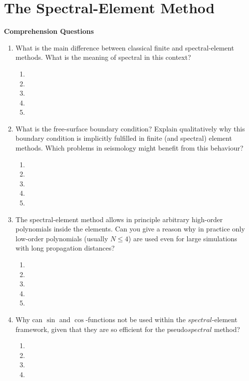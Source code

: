 
\chapter{The Spectral-Element Method} 

{\bf Comprehension Questions}
\begin{enumerate}
\item
What is the main difference between classical finite and spectral-element methods. What is the meaning of spectral in this context?
\begin{enumerate}
\item[]
\item[]
\item[] 
\item[]
\item[] 
\end{enumerate}
\item
What is the free-surface boundary condition? Explain qualitatively why this boundary condition is implicitly fulfilled in finite (and spectral) element methods. Which problems in seismology might benefit from this behaviour?
\begin{enumerate}
\item[]
\item[]
\item[] 
\item[]
\item[] 
\end{enumerate}
\item
The spectral-element method allows in principle arbitrary high-order polynomials inside the elements. Can you give a reason why in practice only low-order polynomials (usually $N\leq4$) are used even for large simulations with long propagation distances? 
\begin{enumerate}
\item[]
\item[]
\item[] 
\item[]
\item[] 
\end{enumerate}
\item
Why can $\sin$ and $\cos$-functions not be used within the $spectral$-element framework, given that they are so efficient for the pseudo$spectral$ method?
\begin{enumerate}
\item[]
\item[]
\item[] 
\item[]

\end{enumerate}
\end{enumerate}
